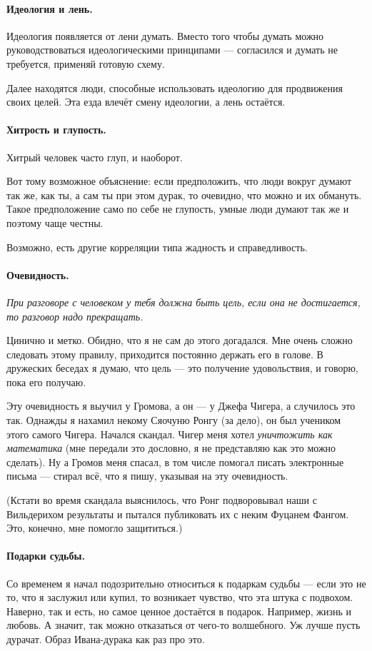 \documentclass{book}
\begin{document}
\paragraph{Идеология и лень.}
Идеология появляется от лени думать.
Вместо того чтобы думать можно руководствоваться идеологическими принципами --- согласился и думать не требуется, применяй готовую схему.

Далее находятся люди, способные использовать идеологию для продвижения своих целей.
Эта езда влечёт смену идеологии, а лень остаётся.

\paragraph{Хитрость и глупость.}
Хитрый человек часто глуп, и наоборот.

Вот тому возможное объяснение:
если предположить, что люди вокруг думают так же, как ты, а сам ты при этом дурак, то очевидно, что можно и их обмануть.
Такое предположение само по себе не глупость, умные люди думают так же и поэтому чаще честны.

Возможно, есть другие корреляции типа жадность и справедливость.  

\paragraph{Очевидность.}
\textit{При разговоре с человеком у тебя должна быть цель, если она не достигается, то разговор надо прекращать.}

Цинично и метко.
Обидно, что я не сам до этого догадался.
Мне очень сложно следовать этому правилу, приходится постоянно держать его в голове.
В дружеских беседах я думаю, что цель --- это получение удовольствия, и говорю, пока его получаю.

Эту очевидность я выучил у Громова, а он --- у Джефа Чигера, а случилось это так.
Однажды я нахамил некому Сяочуню Ронгу (за дело), он был учеником этого самого Чигера.
Начался скандал.
Чигер меня хотел \textit{уничтожить как математика} (мне передали это дословно, я не представляю как это можно сделать).
Ну а Громов меня спасал, в том числе помогал писать электронные письма --- стирал всё, что я пишу, указывая на эту очевидность.

(Кстати во время скандала выяснилось, что Ронг подворовывал наши с Вильдерихом результаты и пытался публиковать их с неким Фуцанем Фангом.
Это, конечно, мне помогло защититься.)

\paragraph{Подарки судьбы.}
Со временем я начал подозрительно относиться к подаркам судьбы --- если это не то, что я заслужил или купил, то возникает чувство, что эта штука с подвохом.
Наверно, так и есть, но самое ценное достаётся в подарок.
Например, жизнь и любовь.
А значит, так можно отказаться от чего-то волшебного.
Уж лучше пусть дурачат.
Образ Ивана-дурака как раз про это.
\end{document}
